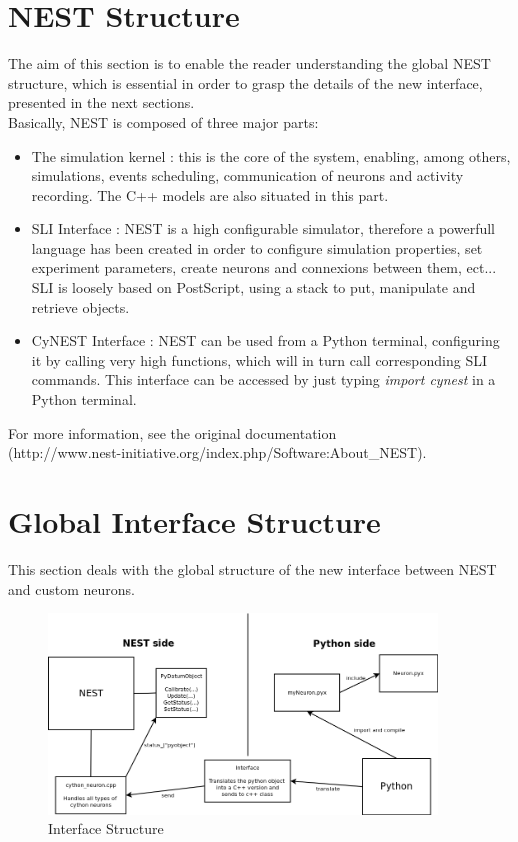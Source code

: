 \documentclass{article}
\begin{document}
\section{NEST Structure}
The aim of this section is to enable the reader understanding the global NEST structure, which is essential in order to grasp the details of the new interface, presented in the next sections.\\
Basically, NEST is composed of three major parts:
\begin{itemize}
\item The simulation kernel : this is the core of the system, enabling, among others, simulations, events scheduling, communication of neurons and activity recording. The C++ models are also situated in this part.
\item SLI Interface : NEST is a high configurable simulator, therefore a powerfull language has been created in order to configure simulation properties, set experiment parameters, create neurons and connexions between them, ect... SLI is loosely based on PostScript, using a stack to put, manipulate and retrieve objects.
\item CyNEST Interface : NEST can be used from a Python terminal, configuring it by calling very high functions, which will in turn call corresponding SLI commands. This interface can be accessed by just typing \emph{import cynest} in a Python terminal.
\end{itemize}
For more information, see the original documentation\\ (http://www.nest-initiative.org/index.php/Software:About\_NEST).

\section{Global Interface Structure}
This section deals with the global structure of the new interface between NEST and custom neurons. 

\begin{figure}[h]
\begin{center}
\includegraphics[width=0.92\textwidth]{Ressources/Interface_Structure}
\caption{Interface Structure}
\end{center}
\end{figure}
\end{document}

